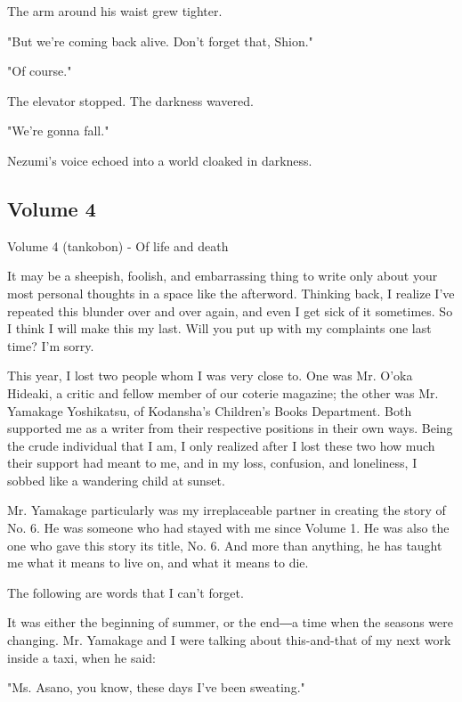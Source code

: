 The arm around his waist grew tighter.

"But we're coming back alive. Don't forget that, Shion."

"Of course."

The elevator stopped. The darkness wavered.

"We're gonna fall."

Nezumi's voice echoed into a world cloaked in darkness.

\protect\hypertarget{index_split_128.html}{}{}

\hypertarget{index_split_128.htmlux5cux23calibre_pb_132}{%
\subsection{Volume 4}\label{index_split_128.htmlux5cux23calibre_pb_132}}

Volume 4 (tankobon) - Of life and death

It may be a sheepish, foolish, and embarrassing thing to write only
about your most personal thoughts in a space like the afterword.
Thinking back, I realize I've repeated this blunder over and over again,
and even I get sick of it sometimes. So I think I will make this my
last. Will you put up with my complaints one last time? I'm sorry.

This year, I lost two people whom I was very close to. One was Mr. O'oka
Hideaki, a critic and fellow member of our coterie magazine; the other
was Mr. Yamakage Yoshikatsu, of Kodansha's Children's Books Department.
Both supported me as a writer from their respective positions in their
own ways. Being the crude individual that I am, I only realized after I
lost these two how much their support had meant to me, and in my loss,
confusion, and loneliness, I sobbed like a wandering child at sunset.

Mr. Yamakage particularly was my irreplaceable partner in creating the
story of No. 6. He was someone who had stayed with me since Volume 1. He
was also the one who gave this story its title, No. 6. And more than
anything, he has taught me what it means to live on, and what it means
to die.

The following are words that I can't forget.

It was either the beginning of summer, or the end―a time when the
seasons were changing. Mr. Yamakage and I were talking about
this-and-that of my next work inside a taxi, when he said:

"Ms. Asano, you know, these days I've been sweating."

